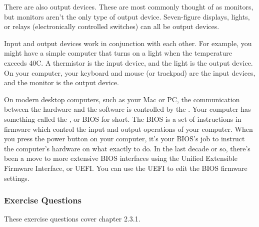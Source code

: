 There are also output devices. These are most commonly thought of as monitors, but monitors aren't the only type of output device. Seven-figure displays, lights, or relays (electronically controlled switches) can all be output devices.\par
Input and output devices work in conjunction with each other. For example, you might have a simple computer that turns on a light when the temperature exceeds 40\textdegree C. A thermistor is the input device, and the light is the output device. On your computer, your keyboard and mouse (or trackpad) are the input devices, and the monitor is the output device.\par
On modern desktop computers, such as your Mac or PC, the communication between the hardware and the software is controlled by the . Your computer has something called the , or BIOS for short. The BIOS is a set of instructions in firmware which control the input and output operations of your computer. When you press the power button on your computer, it's your BIOS's job to instruct the computer's hardware on what exactly to do. In the last decade or so, there's been a move to more extensive BIOS interfaces using the Unified Extensible Firmware Interface, or UEFI. You can use the UEFI to edit the BIOS firmware settings.\par
\subsubsection*{Exercise Questions}
These exercise questions cover chapter 2.3.1. 
\begin{Exercise}
\end{Exercise}
\begin{Exercise}
\end{Exercise}    
\begin{Exercise}
\end{Exercise}
